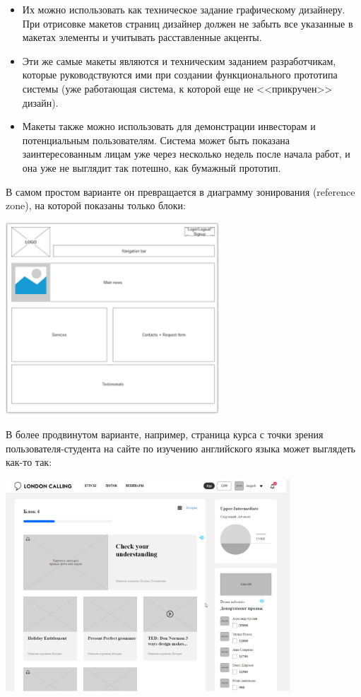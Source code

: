 \documentclass{../../text-style}
\begin{document}
\begin{itemize}
    \item Их можно использовать как техническое задание графическому дизайнеру. При отрисовке макетов страниц дизайнер должен не забыть все указанные в макетах элементы и учитывать расставленные акценты.
    \item Эти же самые макеты являются и техническим заданием разработчикам, которые руководствуются ими при создании функционального прототипа системы (уже работающая система, к которой еще не <<прикручен>> дизайн).
    \item Макеты также можно использовать для демонстрации инвесторам и потенциальным пользователям. Система может быть показана заинтересованным лицам уже через несколько недель после начала работ, и она уже не выглядит так потешно, как бумажный прототип.
\end{itemize}

В самом простом варианте он превращается в диаграмму зонирования (reference zone), на которой показаны только блоки:

\begin{center}
    \includegraphics[width=0.6\textwidth]{wireframe.png}
\end{center}

В более продвинутом варианте, например, страница курса с точки зрения пользователя-студента на сайте по изучению английского языка может выглядеть как-то так:

\begin{center}
    \includegraphics[width=0.8\textwidth]{languageServiceWireframe.png}
\end{center}
\end{document}
